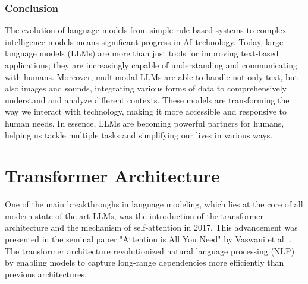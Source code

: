 \subsubsection{Conclusion}

The evolution of language models from simple rule-based systems to complex intelligence models means significant progress in AI technology. Today, large language models (LLMs) are more than just tools for improving text-based applications; they are increasingly capable of understanding and communicating with humans. Moreover, multimodal LLMs are able to handle not only text, but also images and sounds, integrating various forms of data to comprehensively understand and analyze different contexts. These models are transforming the way we interact with technology, making it more accessible and responsive to human needs. In essence, LLMs are becoming powerful partners for humans, helping us tackle multiple tasks and simplifying our lives in various ways. \cite{researchgraph2024}

\section{Transformer Architecture}

One of the main breakthroughs in language modeling, which lies at the core of all modern state-of-the-art LLMs, was the introduction of the transformer architecture and the mechanism of self-attention in 2017. This advancement was presented in the seminal paper "Attention is All You Need" by Vaswani et al. \cite{vaswani2017attention}. The transformer architecture revolutionized natural language processing (NLP) by enabling models to capture long-range dependencies more efficiently than previous architectures.

